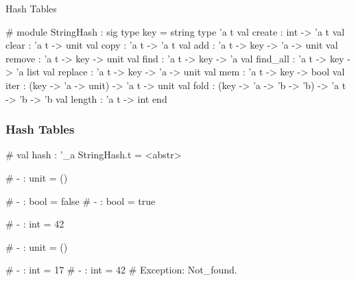 \documentclass{plt}
\begin{document}
\begin{frame}[fragile]{Hash Tables}

\begin{interactive}
# 
module StringHash :
  sig
    type key = string
    type 'a t
    val create : int -> 'a t
    val clear : 'a t -> unit
    val copy : 'a t -> 'a t
    val add : 'a t -> key -> 'a -> unit
    val remove : 'a t -> key -> unit
    val find : 'a t -> key -> 'a
    val find_all : 'a t -> key -> 'a list
    val replace : 'a t -> key -> 'a -> unit
    val mem : 'a t -> key -> bool
    val iter : (key -> 'a -> unit) -> 'a t -> unit
    val fold : (key -> 'a -> 'b -> 'b) -> 'a t -> 'b -> 'b
    val length : 'a t -> int
  end
\end{interactive}

\end{frame}

\begin{frame}[fragile]
  \frametitle{Hash Tables}

\begin{interactive}
# 
val hash : '_a StringHash.t = <abstr>

# 
- : unit = ()

# 
- : bool = false
# 
- : bool = true

# 
- : int = 42

# 
- : unit = ()

# 
- : int = 17
# 
- : int = 42
# 
Exception: Not_found.
\end{interactive}

\end{frame}
\end{document}
